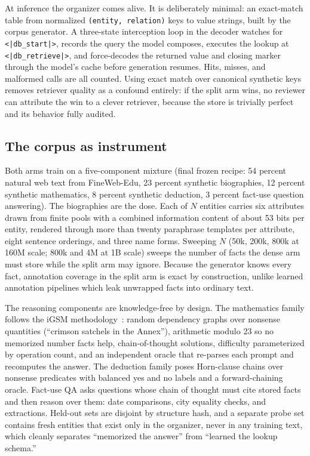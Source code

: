 \documentclass[11pt]{article}
\begin{document}
At inference the organizer comes alive. It is deliberately minimal: an
exact-match table from normalized \texttt{(entity, relation)} keys to
value strings, built by the corpus generator. A three-state interception
loop in the decoder watches for \texttt{<|db\_start|>}, records the query
the model composes, executes the lookup at \texttt{<|db\_retrieve|>}, and
force-decodes the returned value and closing marker through the model's
cache before generation resumes. Hits, misses, and malformed calls are
all counted. Using exact match over canonical synthetic keys removes
retriever quality as a confound entirely: if the split arm wins, no
reviewer can attribute the win to a clever retriever, because the store
is trivially perfect and its behavior fully audited.

\subsection{The corpus as instrument}

Both arms train on a five-component mixture (final frozen recipe: 54
percent natural web text from FineWeb-Edu, 23 percent synthetic
biographies, 12 percent synthetic mathematics, 8 percent synthetic
deduction, 3 percent fact-use question answering). The biographies are
the dose. Each of $N$ entities carries six attributes drawn from finite
pools with a combined information content of about 53 bits per entity,
rendered through more than twenty paraphrase templates per attribute,
eight sentence orderings, and three name forms. Sweeping $N$ (50k, 200k,
800k at 160M scale; 800k and 4M at 1B scale) sweeps the number of facts
the dense arm must store while the split arm may ignore. Because the
generator knows every fact, annotation coverage in the split arm is exact
by construction, unlike learned annotation pipelines which leak unwrapped
facts into ordinary text.

The reasoning components are knowledge-free by design. The mathematics
family follows the iGSM methodology~\cite{igsm}: random dependency graphs
over nonsense quantities (``crimson satchels in the Annex''), arithmetic
modulo 23 so no memorized number facts help, chain-of-thought solutions,
difficulty parameterized by operation count, and an independent oracle
that re-parses each prompt and recomputes the answer. The deduction family
poses Horn-clause chains over nonsense predicates with balanced yes and no
labels and a forward-chaining oracle. Fact-use QA asks questions whose
chain of thought must cite stored facts and then reason over them: date
comparisons, city equality checks, and extractions. Held-out sets are
disjoint by structure hash, and a separate probe set contains fresh
entities that exist only in the organizer, never in any training text,
which cleanly separates ``memorized the answer'' from ``learned the
lookup schema.''
\end{document}
